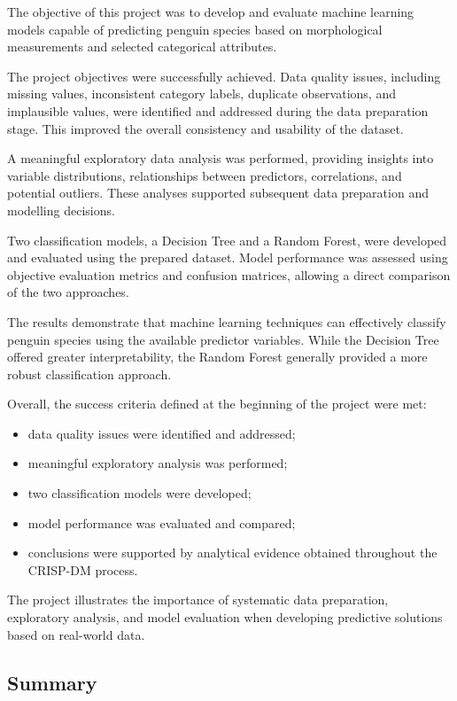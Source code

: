 \documentclass[
]{article}
\providecommand{\tightlist}{%
  \setlength{\itemsep}{0pt}\setlength{\parskip}{0pt}}
\begin{document}
The objective of this project was to develop and evaluate machine
learning models capable of predicting penguin species based on
morphological measurements and selected categorical attributes.

The project objectives were successfully achieved. Data quality issues,
including missing values, inconsistent category labels, duplicate
observations, and implausible values, were identified and addressed
during the data preparation stage. This improved the overall consistency
and usability of the dataset.

A meaningful exploratory data analysis was performed, providing insights
into variable distributions, relationships between predictors,
correlations, and potential outliers. These analyses supported
subsequent data preparation and modelling decisions.

Two classification models, a Decision Tree and a Random Forest, were
developed and evaluated using the prepared dataset. Model performance
was assessed using objective evaluation metrics and confusion matrices,
allowing a direct comparison of the two approaches.

The results demonstrate that machine learning techniques can effectively
classify penguin species using the available predictor variables. While
the Decision Tree offered greater interpretability, the Random Forest
generally provided a more robust classification approach.

Overall, the success criteria defined at the beginning of the project
were met:

\begin{itemize}
\tightlist
\item
  data quality issues were identified and addressed;
\item
  meaningful exploratory analysis was performed;
\item
  two classification models were developed;
\item
  model performance was evaluated and compared;
\item
  conclusions were supported by analytical evidence obtained throughout
  the CRISP-DM process.
\end{itemize}

The project illustrates the importance of systematic data preparation,
exploratory analysis, and model evaluation when developing predictive
solutions based on real-world data.

\subsection{Summary}\label{summary-1}
\end{document}
